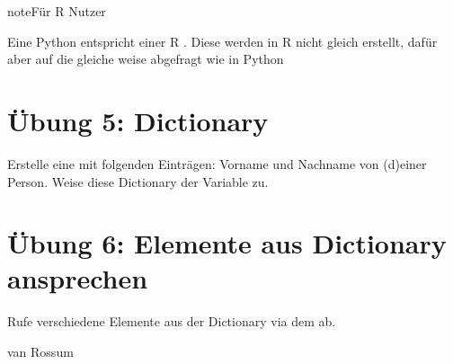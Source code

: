 \documentclass[letterpaper,10pt,english]{sphinxmanual}
\begin{document}
\begin{sphinxadmonition}{note}{Für R Nutzer}

Eine Python  entspricht einer R . Diese werden in R nicht gleich erstellt, dafür aber auf die gleiche weise abgefragt wie  in Python
\end{sphinxadmonition}


\section{Übung 5: Dictionary}
\label{\detokenize{01_02_Python_Basics:ubung-5-dictionary}}
Erstelle eine  mit folgenden Einträgen: Vorname und Nachname von (d)einer Person. Weise diese Dictionary der Variable  zu.

\begin{sphinxVerbatim}[commandchars=\\\{\}]
     
\end{sphinxVerbatim}


\section{Übung 6: Elemente aus Dictionary ansprechen}
\label{\detokenize{01_02_Python_Basics:ubung-6-elemente-aus-dictionary-ansprechen}}
Rufe verschiedene Elemente aus der Dictionary via dem  ab.

\begin{sphinxVerbatim}[commandchars=\\\{\}]
\PYG{p}{[}\PYG{p}{]}

\PYG{p}{[}\PYG{p}{]}
\end{sphinxVerbatim}

\begin{sphinxVerbatim}[commandchars=\\\{\}]
\PYGZsq{}van Rossum\PYGZsq{}
\end{sphinxVerbatim}
\end{document}
